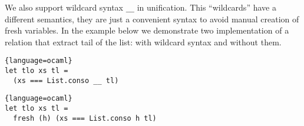 We also support wildcard syntax \lstinline|__| in unification. This ``wildcards'' have a different semantics, they are just a convenient syntax to avoid manual creation of fresh variables. In the example below we demonstrate two implementation of a relation that extract tail of the list: with wildcard syntax and without them.

\begin{minipage}{7cm}
\begin{lstlisting}{language=ocaml}
let tlo xs tl =
  (xs === List.conso __ tl)
\end{lstlisting}
\end{minipage}
\begin{minipage}{9.5cm}
\begin{lstlisting}{language=ocaml}
let tlo xs tl =
  fresh (h) (xs === List.conso h tl)
\end{lstlisting}
\end{minipage}
